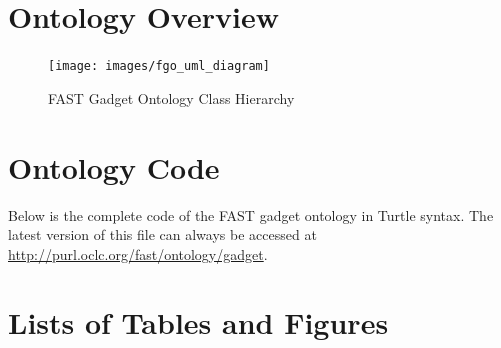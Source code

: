 \documentclass{fast_latex}
\begin{document}
\clearpage
{}
\section{Ontology Overview}

\begin{figure}[h]
  \begin{center}
    \texttt{[image: images/fgo\_uml\_diagram]}
    \caption{FAST Gadget Ontology Class Hierarchy}
    \label{fig:ontology_uml}
  \end{center}
\end{figure}


\clearpage
{}
\section{Ontology Code}

Below is the complete code of the FAST gadget ontology in Turtle syntax. The latest version of this file can always be accessed at \url{http://purl.oclc.org/fast/ontology/gadget}.

\singlespacing
\begin{small}

\end{small}

\clearpage
\doublespacing
{}
\section*{Lists of Tables and Figures}

\listoftables
\listoffigures

\clearpage
{}


\end{document}
